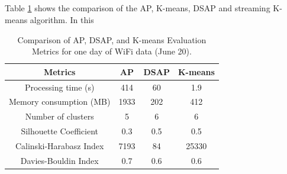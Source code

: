 \subsection{}


Table \ref{comp2} shows the comparison of the AP, K-means, DSAP and streaming K-means algorithm.
In this 


\begin{table}[h]
    \centering
    \caption{Comparison of AP, DSAP, and K-means Evaluation Metrics for one day of WiFi data (June 20).}
    \label{comp2}
    \begin{tabular}{|c|c|c|c|}
    \hline
      Metrics & AP & DSAP & K-means  \\
     \hline
      Processing time (s)         &   414     &      60      &       1.9     \\
     \hline
      Memory consumption (MB)     &   1933    &      202     &      412\\
     \hline
      Number of clusters          &   5       &     6        &        6  \\
      \hline
      Silhouette Coefficient      &   0.3     &      0.5     &      0.5 \\
    \hline
    Calinski-Harabasz Index       &      7193 &       84     &       25330     \\
    \hline
     Davies-Bouldin Index         &     0.7   &      0.6     &       0.6\\
    \hline
    \end{tabular}
\end{table}
































% 